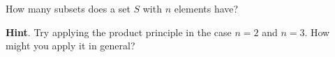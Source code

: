 \documentclass{book}
\begin{document}
\setcounter{cpjt}{89}
\addtocounter{cpjt}{-1}
\begin{activity}\label{SubsetsFirstTime}
\hypertarget{p-644}{}%
How many subsets does a set \(S\) with \(n\) elements have?%
\par\smallskip%
\noindent\textbf{Hint}.\hypertarget{hint-42}{}\quad%
\hypertarget{p-645}{}%
Try applying the product principle in the case \(n = 2\) and \(n = 3\). How might you apply it in general?%
\par\smallskip%
\noindent\end{activity}

\clearpage
\end{document}
